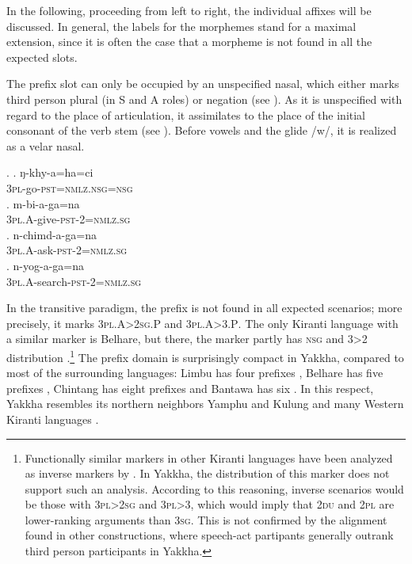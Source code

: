 In the following, proceeding from left to right, the individual affixes  will be discussed. In general, the labels for the morphemes stand for a maximal extension, since  it is often the case that a morpheme is not found in all the expected slots.

The prefix slot can only be occupied by an unspecified nasal, which either marks third person plural (in S and A roles) or negation (see ). As it is unspecified with regard to the place of articulation, it assimilates to the place of the initial consonant of the verb stem (see \Next). Before vowels and the glide /w/, it is realized as a velar nasal. 

\ex. \ag. ŋ-khy-a=ha=ci\\
		{\scshape 3pl}-go-{\scshape pst=nmlz.nsg=nsg}\\
	\bg. m-bi-a-ga=na\\
	{\scshape 3pl.A}-give{\scshape -pst-2=nmlz.sg}\\
\bg. n-chimd-a-ga=na\\
	{\scshape 3pl.A}-ask{\scshape -pst-2=nmlz.sg}\\
 \bg. n-yog-a-ga=na\\
	{\scshape 3pl.A}-search{\scshape -pst-2=nmlz.sg}\\
 
In the transitive paradigm, the prefix is not found in all expected scenarios; more precisely, it  marks {\scshape 3pl.A>2sg.P} and {\scshape 3pl.A>3.P}. The only Kiranti language with a similar marker is Belhare, but there, the marker partly has {\scshape nsg} and 3>2 distribution \citep[551]{Bickel2003Belhare}.\footnote{Functionally similar  markers in other Kiranti languages have been analyzed as inverse markers by \citet{Ebert1991Inverse}. In Yakkha, the distribution of this marker does not support such an analysis. According to this reasoning, inverse scenarios would be those with {\scshape 3pl>2sg} and {\scshape 3pl>3}, which would imply that {\scshape 2du} and {\scshape 2pl} are lower-ranking arguments than {\scshape 3sg}. This is not confirmed by the alignment found in other constructions, where speech-act partipants generally outrank third person participants in Yakkha.} The prefix domain is surprisingly compact in Yakkha, compared to most of the surrounding languages: Limbu has four prefixes \citep{Driem1997A-new-analysis}, Belhare has five prefixes \citep{Bickel2003Belhare}, Chintang has eight prefixes \citep{Schikowski2012_Morphology} and Bantawa has six \citep{Doornenbal2009A-grammar}. In this respect, Yakkha resembles its northern neighbors  Yamphu and Kulung \citep{Rutgers1998Yamphu, Tolsma1999A-grammar} and many Western Kiranti languages \citep[93]{Jacques2012_Agreement}. 

